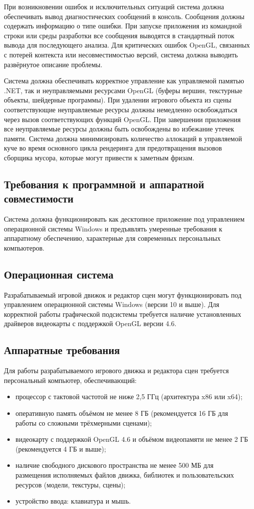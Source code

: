 При возникновении ошибок и исключительных ситуаций система должна обеспечивать вывод диагностических сообщений в консоль. Сообщения должны содержать информацию о типе ошибки. При запуске приложения из командной строки или среды разработки все сообщения выводятся в стандартный поток вывода для последующего анализа. Для критических ошибок OpenGL, связанных с потерей контекста или несовместимостью версий, система должна выводить развёрнутое описание проблемы.

Система должна обеспечивать корректное управление как управляемой памятью .NET, так и неуправляемыми ресурсами OpenGL (буферы вершин, текстурные объекты, шейдерные программы). При удалении игрового объекта из сцены соответствующие неуправляемые ресурсы должны немедленно освобождаться через вызов соответствующих функций OpenGL. При завершении приложения все неуправляемые ресурсы должны быть освобождены во избежание утечек памяти. Система должна минимизировать количество аллокаций в управляемой куче во время основного цикла рендеринга для предотвращения вызовов сборщика мусора, которые могут привести к заметным фризам.

\subsection{Требования к программной и аппаратной совместимости}
Система должна функционировать как десктопное приложение под управлением операционной системы Windows и предъявлять умеренные требования к аппаратному обеспечению, характерные для современных персональных компьютеров.

\subsection{Операционная система}
Разрабатываемый игровой движок и редактор сцен могут функционировать под управлением операционной системы Windows (версии 10 и выше). Для корректной работы графической подсистемы требуется наличие установленных драйверов видеокарты с поддержкой OpenGL версии 4.6.

\subsection{Аппаратные требования}
Для работы разрабатываемого игрового движка и редактора сцен требуется персональный компьютер, обеспечивающий:
\begin{itemize}
	\item процессор с тактовой частотой не ниже 2,5 ГГц (архитектура x86 или x64);
	\item оперативную память объёмом не менее 8 ГБ (рекомендуется 16 ГБ для работы со сложными трёхмерными сценами);
	\item видеокарту с поддержкой OpenGL 4.6 и объёмом видеопамяти не менее 2 ГБ (рекомендуется 4 ГБ и выше);
	\item наличие свободного дискового пространства не менее 500 МБ для размещения исполняемых файлов движка, библиотек и пользовательских ресурсов (модели, текстуры, сцены);
	\item устройство ввода: клавиатура и мышь.
\end{itemize}


